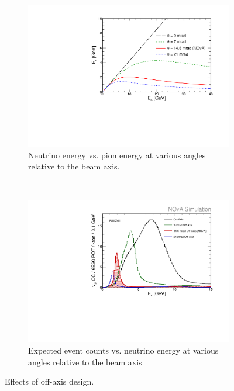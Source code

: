 \begin{figure}[t]
\centering
\begin{subfigure}[c]{0.47\textwidth}
                \centering
                \includegraphics[width=\textwidth]{figures/plots/nova/EnuVSEpi_NOvA-0-7-21.pdf}
                \caption{Neutrino energy vs. pion energy at various angles relative to the beam axis.}
                 \label{EnuEpi}
        \end{subfigure}
        ~
\begin{subfigure}[c]{0.47\textwidth}
                \centering
                \includegraphics[width=\textwidth]{figures/plots/nova/spectrum_FD_NOvA-0-7-21.pdf}
                \caption{Expected \numu event counts vs. neutrino energy at various angles relative to the beam axis}
                \label{fluxEnu}

        \end{subfigure}
        \caption{Effects of off-axis design.}
\end{figure}

